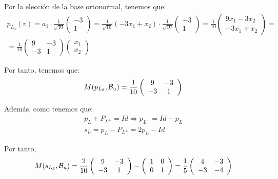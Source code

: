 \begin{ejercicio}
\begin{enumerate}
\begin{enumerate}
        Por la elección de la base ortonormal, tenemos que:
        \begin{multline*}
            p_{L_3}(v)=a_1\cdot \frac{1}{\sqrt{10}}\left(\begin{array}{c}
                 -3 \\ 1
            \end{array}\right)
            =\frac{1}{\sqrt{10}}(-3x_1+x_2) \cdot \frac{1}{\sqrt{10}}\left(\begin{array}{c}
                 -3 \\ 1
            \end{array}\right)
            =\frac{1}{10} \left(\begin{array}{c}
                 9x_1-3x_2 \\ -3x_1+x_2
            \end{array}\right)
            =\\=
            \frac{1}{10}\left(\begin{array}{cc}
                9 & -3 \\
                -3 & 1
            \end{array}\right)\left(\begin{array}{c}
                 x_1 \\ x_2
            \end{array}\right)
        \end{multline*}

        Por tanto, tenemos que:
        \begin{equation*}
            M(p_{L_3},\mathcal{B}_u) = \frac{1}{10}\left(\begin{array}{cc}
                9 & -3 \\
                -3 & 1
            \end{array}\right)
        \end{equation*}

        Además, como tenemos que:
        \begin{gather*}
            p_L +P_{L^\perp} = Id \Longrightarrow p_{L^\perp} = Id -p_L\\
            s_L = p_L - P_{L^\perp} = 2p_L -Id
        \end{gather*}

        Por tanto,
        \begin{equation*}
            M(s_{L_3},\mathcal{B}_u) =\frac{2}{10}\left(\begin{array}{cc}
                9 & -3 \\
                -3 & 1
            \end{array}\right) - \left(\begin{array}{cc}
                1 & 0 \\
                0 & 1
            \end{array}\right)
            = \frac{1}{5}\left(\begin{array}{cc}
                4 & -3 \\
                -3 & -4
            \end{array}\right)
        \end{equation*}



\end{enumerate}
\end{enumerate}
\end{ejercicio}
